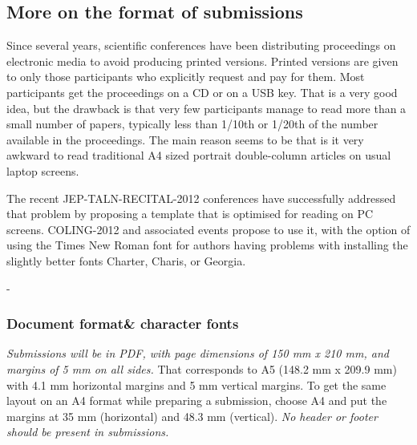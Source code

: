 \documentclass[10pt,a5paper,twoside]{article}
\begin{document}
\subsection{More on the format of submissions}
Since several years, scientific conferences have been distributing proceedings on electronic media to avoid producing printed versions. Printed versions are given to only those participants who explicitly request and pay for them. Most participants get the proceedings on a CD or on a USB key. That is a very good idea, but the drawback is that very few participants manage to read more than a small number of papers, typically less than 1/10th or 1/20th of the number available in the proceedings. The main reason seems to be that is it very awkward to read traditional A4 sized portrait double-column articles on usual laptop screens. 

The recent JEP-TALN-RECITAL-2012 conferences have successfully addressed that problem by proposing a template that is optimised for reading on PC screens. COLING-2012 and associated events propose to use it, with the option of using the Times New Roman font for authors having problems with installing the slightly better fonts Charter, Charis, or Georgia. 

-
\subsubsection{Document format\& character fonts}
\emph{Submissions will be in PDF, with page dimensions of 150 mm x 210 mm, and margins of 5 mm on all sides.} That corresponds to A5 (148.2 mm x 209.9 mm) with 4.1 mm horizontal margins and 5 mm vertical margins.  To get the same layout on an A4 format while preparing a submission, choose A4 and put the margins at 35 mm (horizontal) and 48.3 mm (vertical).
\newpage
\emph{No header or footer should be present in submissions.}
\end{document}
